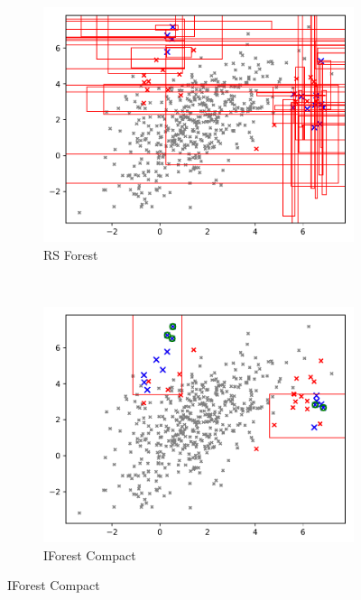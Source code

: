 \documentclass{article} %
\begin{document}
\begin{figure}
	~ %
	\begin{subfigure}[b]{0.3\textwidth}
		\includegraphics[width=\textwidth]{leaf_trees/query_candidate_regions_ntop5_50_trees_rsforest}
		\caption{RS Forest}
		\label{fig:rsforest_rects}
	\end{subfigure} \\
    \begin{subfigure}[b]{0.3\textwidth}
    	\includegraphics[width=\textwidth]{leaf_trees/query_compact_ntop5_100_trees_aad_iforest}
    	\caption{IForest Compact}
    	\label{fig:iforest_compact_rects}
    \end{subfigure}

\end{figure}
\end{document}

